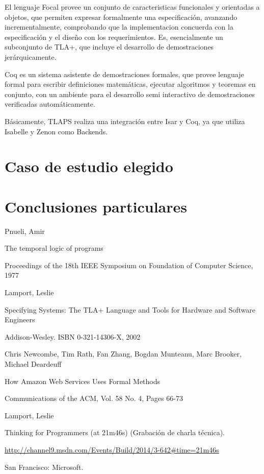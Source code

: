 \documentclass[spanish]{llncs}
\begin{document}
  El lenguaje Focal provee un conjunto de caracteristicas funcionales y orientadas a objetos, que permiten expresar formalmente una especificación, avanzando incrementalmente,
  comprobando que la implementacion concuerda con la especificación y el diseño con los requerimientos. Es, esencialmente un subconjunto de TLA+, que incluye el desarrollo 
  de demostraciones jerárquicamente.

  Coq es un sistema asistente de demostraciones formales, que provee lenguaje formal para escribir definiciones matemáticas, ejecutar algoritmos y teoremas en conjunto,
  con un ambiente para el desarrollo semi interactivo de demostraciones verificadas automáticamente.

  Básicamente, TLAPS realiza una integración entre Isar y Coq, ya que utiliza Isabelle y Zenon como Backends.

\section{Caso de estudio elegido}


\section{Conclusiones particulares}


%
%
\begin{thebibliography}{5}
%
Pnueli, Amir

The temporal logic of programs

Proceedings of the 18th IEEE Symposium on Foundation of Computer Science, 1977

Lamport, Leslie

Specifying Systems: The TLA+ Language and Tools for Hardware and Software Engineers

Addison-Wesley. ISBN 0-321-14306-X, 2002

Chris Newcombe, Tim Rath, Fan Zhang, Bogdan Munteanu, Marc Brooker, Michael Deardeuff 

How Amazon Web Services Uses Formal Methods

Communications of the ACM, Vol. 58 No. 4, Pages 66-73

Lamport, Leslie 

Thinking for Programmers (at 21m46s) (Grabación de charla técnica). 

\url{http://channel9.msdn.com/Events/Build/2014/3-642#time=21m46s}

San Francisco: Microsoft.

\end{thebibliography}

\clearpage
\end{document}
